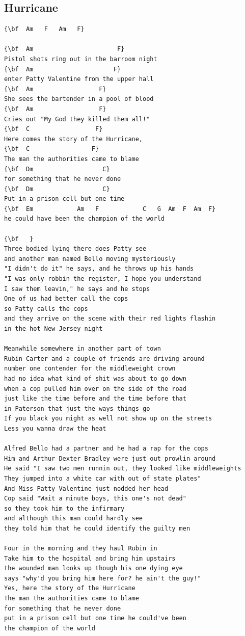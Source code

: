\documentclass[a4paper]{article}
\begin{document}
\subsection{Hurricane}
\begin{Verbatim}[commandchars=\\\{\}]
{\bf  Am   F   Am   F}

{\bf  Am                       F}
Pistol shots ring out in the barroom night
{\bf  Am                      F}
enter Patty Valentine from the upper hall
{\bf  Am                  F}
She sees the bartender in a pool of blood
{\bf  Am                  F}
Cries out "My God they killed them all!"
{\bf  C                  F}
Here comes the story of the Hurricane,
{\bf  C                 F}
The man the authorities came to blame
{\bf  Dm                   C}
for something that he never done
{\bf  Dm                   C}
Put in a prison cell but one time
{\bf  Em            Am   F            C   G  Am  F  Am  F}
he could have been the champion of the world

{\bf   }
Three bodied lying there does Patty see
and another man named Bello moving mysteriously
"I didn't do it" he says, and he throws up his hands
"I was only robbin the register, I hope you understand
I saw them leavin," he says and he stops
One of us had better call the cops
so Patty calls the cops
and they arrive on the scene with their red lights flashin
in the hot New Jersey night

Meanwhile somewhere in another part of town
Rubin Carter and a couple of friends are driving around
number one contender for the middleweight crown
had no idea what kind of shit was about to go down
when a cop pulled him over on the side of the road
just like the time before and the time before that
in Paterson that just the ways things go
If you black you might as well not show up on the streets
Less you wanna draw the heat

Alfred Bello had a partner and he had a rap for the cops
Him and Arthur Dexter Bradley were just out prowlin around
He said "I saw two men runnin out, they looked like middleweights
They jumped into a white car with out of state plates"
And Miss Patty Valentine just nodded her head
Cop said "Wait a minute boys, this one's not dead"
so they took him to the infirmary
and although this man could hardly see
they told him that he could identify the guilty men

Four in the morning and they haul Rubin in
Take him to the hospital and bring him upstairs
the wounded man looks up though his one dying eye
says "why'd you bring him here for? he ain't the guy!"
Yes, here the story of the Hurricane
The man the authorities came to blame
for something that he never done
put in a prison cell but one time he could've been
the champion of the world


\end{Verbatim}
\end{document}
